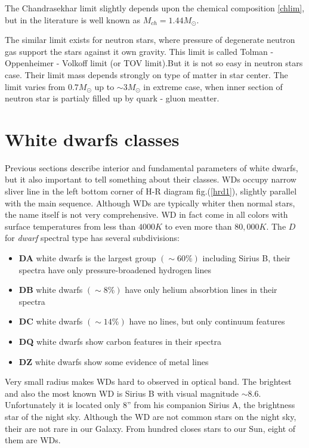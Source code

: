 \documentclass[oneside,a4paper,11pt]{report}
\begin{document}
The Chandrasekhar limit slightly depends upon the chemical composition \eqref{chlim}, but in the literature is well known as $M_{ch} = 1.44M_\odot$.    
  
The similar limit exists for neutron stars, where pressure of degenerate neutron gas support the stars against it own gravity. 
This limit is called Tolman - Oppenheimer - Volkoff limit (or TOV limit).But it is not so easy in neutron stars case. Their limit 
mass depends strongly on type of matter in star center. The limit varies from $0.7 M_\odot$ up to $\sim 3M_\odot$ in extreme case, when inner section of 
neutron star is partialy filled up by quark - gluon meatter.     


\section{White dwarfs classes}
Previous sections describe interior and fundamental parameters of white dwarfs, but it also important to tell something about their classes.   
WDs occupy narrow sliver line in the left bottom corner of H-R diagram fig.(\ref{hrd1}), slightly parallel with the main sequence.  
Although WDs are typically whiter then normal stars, the name itself is not very comprehensive. WD in fact come in all colors with surface 
temperatures from less than $4000K$ to even more than $80,000K$. The $D$ for \textit{dwarf} spectral type has several subdivisions:
\begin{itemize}
 \item \textbf{DA} white dwarfs is the largest group $(\sim 60\%)$ including Sirius B, their spectra have only pressure-broadened hydrogen lines 
 \item \textbf{DB} white dwarfs $(\sim 8\%)$ have only helium absorbtion lines in their spectra 
 \item \textbf{DC} white dwarfs $(\sim 14\%)$ have no lines, but only continuum features
 \item \textbf{DQ} white dwarfs show carbon features in their spectra
 \item \textbf{DZ} white dwarfs show some evidence of metal lines
\end{itemize}

Very small radius makes WDs hard to observed in optical band. The brightest and also the most known WD is Sirius B with visual magnitude $\sim8.6$. 
Unfortunately it is located only $8”$ from his companion Sirius A, the brightness star of the night sky. Although the WD are not common stars 
on the  night sky, their are not rare in our Galaxy. From hundred closes stars to our Sun, eight of them are WDs.
\end{document}
